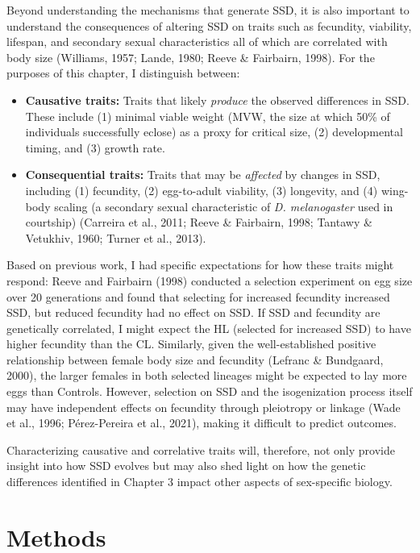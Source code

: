 \documentclass[12pt,reqno,oneside]{report}
\begin{document}
Beyond understanding the mechanisms that generate SSD, it is also important to understand the consequences of altering SSD on traits such as fecundity, viability, lifespan, and secondary sexual characteristics all of which are correlated with body size (Williams, 1957; Lande, 1980; Reeve \& Fairbairn, 1998). For the purposes of this chapter, I distinguish between:

\begin{itemize}
\item \textbf{Causative traits:} Traits that likely \textit{produce} the observed differences in SSD. These include (1) minimal viable weight (MVW, the size at which 50\% of individuals successfully eclose) as a proxy for critical size, (2) developmental timing, and (3) growth rate.

\item \textbf{Consequential traits:} Traits that may be \textit{affected} by changes in SSD, including (1) fecundity, (2) egg-to-adult viability, (3) longevity, and (4) wing-body scaling (a secondary sexual characteristic of \textit{D. melanogaster} used in courtship) (Carreira et al., 2011; Reeve \& Fairbairn, 1998; Tantawy \& Vetukhiv, 1960; Turner et al., 2013). %
\end{itemize}

Based on previous work, I had specific expectations for how these traits might respond: Reeve and Fairbairn (1998) conducted a selection experiment on egg size over 20 generations and found that selecting for increased fecundity increased SSD, but reduced fecundity had no effect on SSD. If SSD and fecundity are genetically correlated, I might expect the HL (selected for increased SSD) to have higher fecundity than the CL. Similarly, given the well-established positive relationship between female body size and fecundity (Lefranc \& Bundgaard, 2000), the larger females in both selected lineages might be expected to lay more eggs than Controls. However, selection on SSD and the isogenization process itself may have independent effects on fecundity through pleiotropy or linkage (Wade et al., 1996; Pérez-Pereira et al., 2021), making it difficult to predict outcomes.

Characterizing causative and correlative traits will, therefore, not only provide insight into how SSD evolves but may also shed light on how the genetic differences identified in Chapter 3 impact other aspects of sex-specific biology.

\section{Methods}
\end{document}
